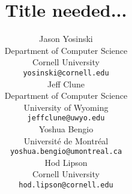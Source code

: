 \documentclass{article} %
\title{Title needed...}
\author{
Jason Yosinski \\
Department of Computer Science\\
Cornell University \\
\texttt{yosinski@cornell.edu} \\
\And
Jeff Clune \\
Department of Computer Science \\
University of Wyoming \\
\texttt{jeffclune@uwyo.edu} \\
\AND
Yoshua Bengio \\
Universit\'{e} de Montr\'{e}al \\
\texttt{yoshua.bengio@umontreal.ca} \\
\And
Hod Lipson \\
Cornell University \\
\texttt{hod.lipson@cornell.edu} \\
}
\begin{document}
\maketitle

\begin{abstract}

\end{abstract}





%



{\small


}
\end{document}
